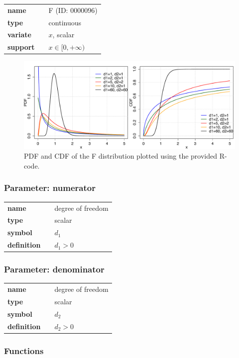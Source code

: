 \begin{tabular}{p{2cm}cl}
\textbf{name} & & F (ID: 0000096)\\ 
 
\textbf{type} & & continuous \\ 

\textbf{variate} & & $x$, scalar \\ 

\textbf{support} & & $x \in [0,+\infty)$
\end{tabular}
\begin{figure}[ht!]
\centering
  \includegraphics[width=140mm]{pics/F_pdf_cdf.pdf}
 \caption{PDF and CDF of the F distribution plotted using the provided R-code.}
 \label{fig:F_pdf_cdf}
\end{figure}
\subsubsection*{Parameter: numerator}

\noindent\begin{tabular}{p{2cm}cl}
\textbf{name} & & degree of freedom \\
\textbf{type} & & scalar \\
\textbf{symbol} & & $d_1$  \\
\textbf{definition} & & $d_1 > 0$
\end{tabular}
\subsubsection*{Parameter: denominator}

\noindent\begin{tabular}{p{2cm}cl}
\textbf{name} & & degree of freedom \\
\textbf{type} & & scalar \\
\textbf{symbol} & & $d_2$  \\
\textbf{definition} & & $d_2 > 0$
\end{tabular}
\subsubsection*{Functions}

